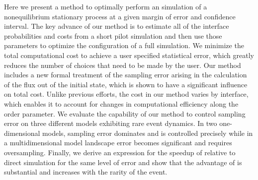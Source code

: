 
Here we present a method to optimally perform an  simulation of a nonequilibrium stationary process at a given margin of error and confidence interval. The key advance of our method is to estimate all of the interface probabilities and costs from a short pilot simulation and then use those parameters to optimize the configuration of a full  simulation. We minimize the total computational cost to achieve a user specified statistical error, which greatly reduces the number of choices that need to be made by the user. Our method includes a new formal treatment of the sampling error arising in the calculation of the flux out of the initial state, which is shown to have a significant influence on total cost. Unlike previous efforts, the cost in our method varies by interface, which enables it to account for changes in computational efficiency along the order parameter. We evaluate the capability of our method to control sampling error on three different models exhibiting rare event dynamics. In two one-dimensional models, sampling error dominates and is controlled precisely while in a multidimensional model landscape error becomes significant and requires oversampling. Finally, we derive an expression for the speedup of  relative to direct simulation for the same level of error and show that the advantage of  is substantial and increases with the rarity of the event.


